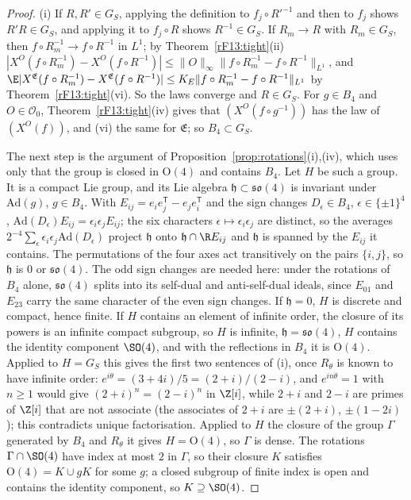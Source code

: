 \begin{proof}
(i) If $R,R'\in G_S$, applying the definition to $f_j\circ R'^{-1}$ and then
to $f_j$ shows $R'R\in G_S$, and applying it to $f_j\circ R$ shows $R^{-1}\in
G_S$. If $R_m\to R$ with $R_m\in G_S$, then $f\circ R_m^{-1}\to f\circ R^{-1}$
in $L^1$; by Theorem~\ref{rF13:tight}(ii) $|X^O(f\circ R_m^{-1})-X^O(f\circ
R^{-1})|\le\|O\|_\infty\|f\circ R_m^{-1}-f\circ R^{-1}\|_{L^1}$, and
$\E|X^{\mathfrak E}(f\circ R_m^{-1})-X^{\mathfrak E}(f\circ R^{-1})|\le K_E
\|f\circ R_m^{-1}-f\circ R^{-1}\|_{L^1}$ by Theorem~\ref{rF13:tight}(vi). So
the laws converge and $R\in G_S$. For $g\in B_4$ and $O\in\mathcal O_0$,
Theorem~\ref{rF13:tight}(iv) gives that $(X^O(f\circ g^{-1}))$ has the law of
$(X^O(f))$, and (vi) the same for $\mathfrak E$; so $B_4\subset G_S$.

The next step is the argument of Proposition~\ref{prop:rotations}(i),(iv),
which uses only that the group is closed in $\mathrm O(4)$ and contains
$B_4$. Let $H$ be such a group. It is a compact Lie group, and its Lie
algebra $\mathfrak h\subset\mathfrak{so}(4)$ is invariant under
$\mathrm{Ad}(g)$, $g\in B_4$. With $E_{ij}=e_ie_j^{\mathsf T}-e_je_i^{\mathsf
T}$ and the sign changes $D_\epsilon\in B_4$, $\epsilon\in\{\pm1\}^4$,
$\mathrm{Ad}(D_\epsilon)E_{ij}=\epsilon_i\epsilon_jE_{ij}$; the six
characters $\epsilon\mapsto\epsilon_i\epsilon_j$ are distinct, so the
averages $2^{-4}\sum_\epsilon\epsilon_i\epsilon_j\mathrm{Ad}(D_\epsilon)$
project $\mathfrak h$ onto $\mathfrak h\cap\R E_{ij}$ and $\mathfrak h$ is
spanned by the $E_{ij}$ it contains. The permutations of the four axes act
transitively on the pairs $\{i,j\}$, so $\mathfrak h$ is $0$ or
$\mathfrak{so}(4)$. The odd sign changes are needed here: under the
rotations of $B_4$ alone, $\mathfrak{so}(4)$ splits into its self-dual and
anti-self-dual ideals, since $E_{01}$ and $E_{23}$ carry the same character
of the even sign changes. If $\mathfrak h=0$, $H$ is discrete and compact,
hence finite. If $H$ contains an element of infinite order, the closure of
its powers is an infinite compact subgroup, so $H$ is infinite,
$\mathfrak h=\mathfrak{so}(4)$, $H$ contains the identity component
$\SO(4)$, and with the reflections in $B_4$ it is $\mathrm O(4)$. Applied to
$H=G_S$ this gives the first two sentences of (i), once $R_\theta$ is known
to have infinite order: $e^{i\theta}=(3+4i)/5=(2+i)/(2-i)$, and
$e^{in\theta}=1$ with $n\ge1$ would give $(2+i)^n=(2-i)^n$ in $\Z[i]$,
while $2+i$ and $2-i$ are primes of $\Z[i]$ that are not associate (the
associates of $2+i$ are $\pm(2+i)$, $\pm(1-2i)$); this contradicts unique
factorisation. Applied to $H$ the closure of the group $\Gamma$ generated by
$B_4$ and $R_\theta$ it gives $H=\mathrm O(4)$, so $\Gamma$ is dense. The
rotations $\Gamma\cap\SO(4)$ have index at most $2$ in $\Gamma$, so their
closure $K$ satisfies $\mathrm O(4)=K\cup gK$ for some $g$; a closed
subgroup of finite index is open and contains the identity component, so
$K\supseteq\SO(4)$.


\end{proof}
